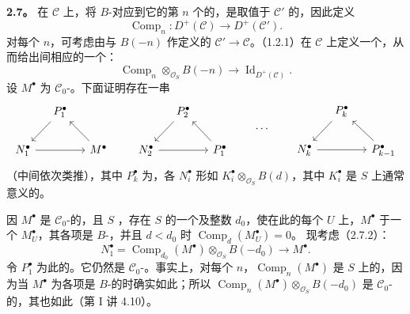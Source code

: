 \textbf{2.7。} 在 $\mathscr C$ 上，将 $B$-对应到它的第 $n$ 个的，是取值于 $\mathscr C'$ 的，因此定义
\[
\operatorname{Comp}_n:D^+(\mathscr C)\longrightarrow D^+(\mathscr C').\tag{2.7.1}
\]
对每个 $n$，可考虑由与 $B(-n)$ 作定义的 $\mathscr C'\to\mathscr C$。（1.2.1）在 $\mathscr C$ 上定义一个，从而给出间相应的一个：
\[
\operatorname{Comp}_n\otimes_{\mathcal O_S}B(-n)
\longrightarrow\operatorname{Id}_{D^+(\mathscr C)}.\tag{2.7.2}
\]
设 $M^\bullet$ 为 $\mathscr C_0$-。下面证明存在一串
\[
\begin{tikzcd}[column sep=small]
&P_1^\bullet\arrow[dl]&\\
N_1^\bullet\arrow[rr]&&M^\bullet\arrow[ul]
\end{tikzcd}
\qquad
\begin{tikzcd}[column sep=small]
&P_2^\bullet\arrow[dl]&\\
N_2^\bullet\arrow[rr]&&P_1^\bullet\arrow[ul]
\end{tikzcd}
\qquad\cdots\qquad
\begin{tikzcd}[column sep=small]
&P_k^\bullet\arrow[dl]&\\
N_k^\bullet\arrow[rr]&&P_{k-1}^\bullet\arrow[ul]
\end{tikzcd}
\]
（中间依次类推），其中 $P_k^\bullet$ 为，各 $N_i^\bullet$ 形如 $K_i^\bullet\otimes_{\mathcal O_S}B(d)$，其中 $K_i^\bullet$ 是 $S$ 上通常意义的。

因 $M^\bullet$ 是 $\mathscr C_0$-的，且 $S$ ，存在 $S$ 的一个及整数 $d_0$，使在此的每个 $U$ 上，$M^\bullet$ 于一个 $M_U^\bullet$，其各项是 $B$-，并且 $d<d_0$ 时 $\operatorname{Comp}_d(M_U^\bullet)=0$。
现考虑（2.7.2）：
\[
N_1^\bullet=\operatorname{Comp}_{d_0}(M^\bullet)\otimes_{\mathcal O_S}B(-d_0)
\longrightarrow M^\bullet.
\]
令 $P_1^\bullet$ 为此的。它仍然是 $\mathscr C_0$-。事实上，对每个 $n$，$\operatorname{Comp}_n(M^\bullet)$ 是 $S$ 上的，因为当 $M^\bullet$ 为各项是 $B$-的时确实如此；所以 $\operatorname{Comp}_n(M^\bullet)\otimes_{\mathcal O_S}B(-d_0)$ 是 $\mathscr C_0$-的，其也如此（第 I 讲 4.10）。

